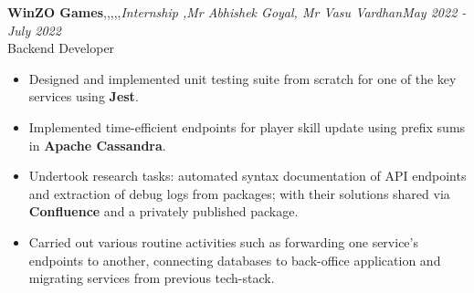 \textbf{WinZO Games}\sep\ts\sep\react\sep\cassie\sep\jest\sep{\it Internship \sep Mr Abhishek Goyal, Mr Vasu Vardhan}\hfill {\sl \small May 2022 - July 2022}\\
\vspace{-5pt}
\emerrow Backend Developer
\begin{itemize}[itemsep = -1.3 mm, leftmargin=*]
\item Designed and implemented unit testing suite from scratch for one of the key services using {\bf Jest}.
\item Implemented time-efficient endpoints for player skill update using prefix sums in {\bf Apache Cassandra}.
\item Undertook research tasks: automated syntax documentation of API endpoints and extraction of debug logs from packages; with their solutions shared via {\bf Confluence} and a privately published package.
\item Carried out various routine activities such as forwarding one service's endpoints to another, connecting databases to back-office application and migrating services from previous tech-stack.
\end{itemize}